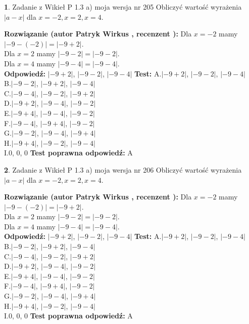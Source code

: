 \documentclass[12pt, a4paper]{article}
\theoremstyle{definition} %
\newtheorem{zad}{}
\newcommand{\zadStart}[1]{\begin{zad}#1\newline}
\newcommand{\zadStop}{\end{zad}}
\newcommand{\rozwStart}[2]{\noindent \textbf{Rozwiązanie (autor #1 , recenzent #2): }\newline}
\newcommand{\rozwStop}{\newline}
\newcommand{\odpStart}{\noindent \textbf{Odpowiedź:}\newline}
\newcommand{\odpStop}{\newline}
\newcommand{\testStart}{\noindent \textbf{Test:}\newline}
\newcommand{\testStop}{\newline}
\newcommand{\kluczStart}{\noindent \textbf{Test poprawna odpowiedź:}\newline}
\newcommand{\kluczStop}{\newline}
\begin{document}
\zadStart{Zadanie z Wikieł P 1.3 a) moja wersja nr 205}
Obliczyć wartość wyrażenia $|a - x|$ dla $x=-2,x=2,x=4$.
\zadStop
\rozwStart{Patryk Wirkus}{}
Dla $x = -2$ mamy $|-9 - (-2)| = |-9 + 2|$.\\
Dla $x = 2$ mamy $|-9 - 2| = |-9 - 2|$.\\
Dla $x = 4$ mamy $|-9 - 4| = |-9 - 4|$.\\
\rozwStop
\odpStart
$|-9 + 2|$, $|-9 - 2|$, $|-9 - 4|$
\odpStop
\testStart
A.$|-9 + 2|$, $|-9 - 2|$, $|-9 - 4|$\\
B.$|-9 - 2|$, $|-9 + 2|$, $|-9 - 4|$\\
C.$|-9 - 4|$, $|-9 - 2|$, $|-9 + 2|$\\
D.$|-9 + 2|$, $|-9 - 4|$, $|-9 - 2|$\\
E.$|-9 + 4|$, $|-9 - 4|$, $|-9 - 2|$\\
F.$|-9 - 4|$, $|-9 + 4|$, $|-9 - 2|$\\
G.$|-9 - 2|$, $|-9 - 4|$, $|-9 + 4|$\\
H.$|-9 + 4|$, $|-9 - 2|$, $|-9 - 4|$\\
I.$0$, $0$, $0$
\testStop
\kluczStart
A
\kluczStop



\zadStart{Zadanie z Wikieł P 1.3 a) moja wersja nr 206}
Obliczyć wartość wyrażenia $|a - x|$ dla $x=-2,x=2,x=4$.
\zadStop
\rozwStart{Patryk Wirkus}{}
Dla $x = -2$ mamy $|-9 - (-2)| = |-9 + 2|$.\\
Dla $x = 2$ mamy $|-9 - 2| = |-9 - 2|$.\\
Dla $x = 4$ mamy $|-9 - 4| = |-9 - 4|$.\\
\rozwStop
\odpStart
$|-9 + 2|$, $|-9 - 2|$, $|-9 - 4|$
\odpStop
\testStart
A.$|-9 + 2|$, $|-9 - 2|$, $|-9 - 4|$\\
B.$|-9 - 2|$, $|-9 + 2|$, $|-9 - 4|$\\
C.$|-9 - 4|$, $|-9 - 2|$, $|-9 + 2|$\\
D.$|-9 + 2|$, $|-9 - 4|$, $|-9 - 2|$\\
E.$|-9 + 4|$, $|-9 - 4|$, $|-9 - 2|$\\
F.$|-9 - 4|$, $|-9 + 4|$, $|-9 - 2|$\\
G.$|-9 - 2|$, $|-9 - 4|$, $|-9 + 4|$\\
H.$|-9 + 4|$, $|-9 - 2|$, $|-9 - 4|$\\
I.$0$, $0$, $0$
\testStop
\kluczStart
A
\kluczStop
\end{document}
